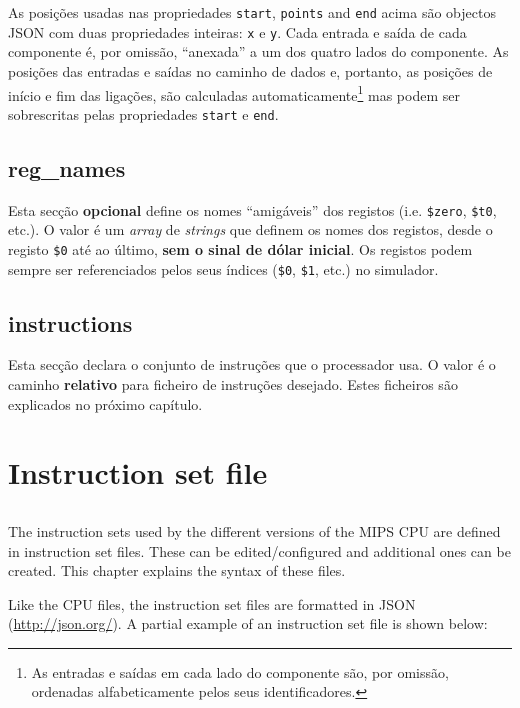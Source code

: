 \documentclass[11pt,a4paper,twoside,titlepage]{report}
\begin{document}
As posições usadas nas propriedades \verb+start+, \verb+points+ and \verb+end+
acima são objectos JSON com duas propriedades inteiras: \verb+x+ e \verb+y+.
Cada entrada e saída de cada componente é, por omissão, ``anexada'' a um dos
quatro lados do componente.
As posições das entradas e saídas no caminho de dados e, portanto, as posições
de início e fim das ligações, são calculadas automaticamente\footnote{As
entradas e saídas em cada lado do componente são, por omissão, ordenadas
alfabeticamente pelos seus identificadores.} mas podem ser sobrescritas pelas
propriedades \verb+start+ e \verb+end+.


\section{reg\_names}

Esta secção \textbf{opcional} define os nomes ``amigáveis'' dos registos (i.e.
\verb+$zero+, \verb+$t0+, etc.).
O valor é um \emph{array} de \emph{strings} que definem os nomes dos registos,
desde o registo \verb+$0+ até ao último, \textbf{sem o sinal de dólar inicial}.
Os registos podem sempre ser referenciados pelos seus índices (\verb+$0+,
\verb+$1+, etc.) no simulador.


\section{instructions}

Esta secção declara o conjunto de instruções que o processador usa.
O valor é o caminho \textbf{relativo} para ficheiro de instruções desejado.
Estes ficheiros são explicados no próximo capítulo.


\chapter{Instruction set file}

\section*{}

The instruction sets used by the different versions of the MIPS CPU
are defined in instruction set files.
These can be edited/configured and additional ones can be created.
This chapter explains the syntax of these files.

Like the CPU files, the instruction set files are formatted in 
JSON (\url{http://json.org/}).
A partial example of an instruction set file is shown below:
\end{document}
